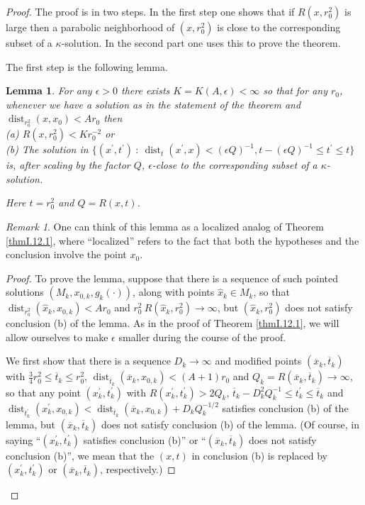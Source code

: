 \documentclass[12pt]{amsart}
\newcommand{\dist}{\operatorname{dist}}
\numberwithin{equation}{section}
\theoremstyle{plain}
\newtheorem{lemma}[equation]{Lemma}
\theoremstyle{definition}
\theoremstyle{remark}
\newtheorem{remark}[equation]{Remark}
\begin{document}
\begin{proof}
The proof is in two steps.  In the first step one shows that
if $R(x, r_0^2)$ is large then a parabolic neighborhood of
$(x, r_0^2)$ is close to the corresponding subset of a
$\kappa$-solution.  In the second part one uses this to
prove the theorem.

The first step is the following lemma.

\begin{lemma} \label{12.2lemma}
For any $\epsilon > 0$ there exists 
$K = K(A, \epsilon) < \infty$
so that for any $r_0$,
whenever we have a solution as in the statement of the theorem 
and $\dist_{r_0^2}(x, x_0) <
A r_0$ then  \\
(a) $R(x, r_0^2) < K r_0^{-2}$ or \\
(b) The solution in
$\{(x^\prime, t^\prime) \: : \: \dist_{t}(x^\prime, x) <
(\epsilon Q)^{-1}, t - (\epsilon Q)^{-1} \le t^\prime \le t \}$ is,
after scaling by the factor $Q$, $\epsilon$-close to the
corresponding subset of a $\kappa$-solution. 

Here $t = r_0^2$ and
$Q = R(x,t)$.
\end{lemma}
\begin{remark}
One can think of this lemma as a
localized analog of Theorem \ref{thmI.12.1}, where ``localized'' refers to
the fact that both the hypotheses and the conclusion involve the
point $x_0$.
\end{remark}

\begin{proof}
To prove the lemma, 
suppose that there is
a sequence of such pointed solutions
$(M_k, x_{0,k}, g_k(\cdot))$, along with points
$\hat{x}_k \in M_k$, so that $\dist_{r_0^2}(\hat{x}_k, x_{0,k}) <
A r_0$ and $r_0^2 \: R(\hat{x}_k, r_0^2) \rightarrow \infty$, but 
$(\hat{x}_k, r_0^2)$ does not satisfy conclusion (b) of the
lemma. As in the proof of Theorem \ref{thmI.12.1}, we will allow ourselves to make
$\epsilon$ smaller during the course of the proof.

We first show that there is a sequence $D_k \rightarrow \infty$
and modified points $(\overline{x}_k, \overline{t}_k)$
with $\frac{3}{4} r_0^{2} \le \overline{t}_k \le r_0^{2}$,
$\dist_{\overline{t}_k}(\overline{x}_k, x_{0,k}) < (A+1) r_0$ and
$Q_k = R(\overline{x}_k, \overline{t}_k) \rightarrow \infty$, 
so that any point
$(x^\prime_k, t^\prime_k)$ with $R(x^\prime_k, t^\prime_k) > 2Q_k$, 
$\overline{t}_k - D_k^2 Q_k^{-1} \le
t^\prime_k \le \overline{t}_k$ and 
$\dist_{t^\prime_k}(x^\prime_k, {x}_{0,k}) 
< \dist_{\overline{t}_k}(\overline{x}_k, 
x_{0,k}) +
D_k Q_k^{-1/2}$ satisfies conclusion (b) of the lemma, 
but $(\overline{x}_k, \overline{t}_k)$ does not satisfy conclusion (b) of
the lemma. (Of course, in saying ``$(x^\prime_k, t^\prime_k)$
satisfies conclusion (b)'' or
``$(\overline{x}_k, \overline{t}_k)$ does not satisfy conclusion (b)'', we mean that
the $(x,t)$ in conclusion (b) is replaced by $(x^\prime_k, t^\prime_k)$ or
$(\overline{x}_k, \overline{t}_k)$, respectively.)


\end{proof}
\end{proof}
\end{document}
